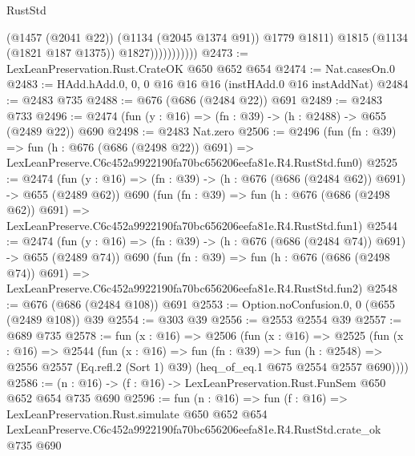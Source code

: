 \begin{lexlean}{RustStd}
\begin{coremodule}
                            (@1457 (@2041 @22))
                            (@1134 (@2045 @1374 @91))
                            @1779
                            @1811)
                          @1815
                          (@1134 (@1821 @187 @1375))
                          @1827)))))))))))
@2473 := LexLeanPreservation.Rust.CrateOK @650 @652 @654
@2474 := Nat.casesOn.{0}
@2483 := HAdd.hAdd.{0, 0, 0} @16 @16 @16 (instHAdd.{0} @16 instAddNat)
@2484 := @2483 @735
@2488 := @676 (@686 (@2484 @22)) @691
@2489 := @2483 @733
@2496 := @2474 (fun (y : @16) => (fn : @39) -> (h : @2488) -> @655 (@2489 @22)) @690
@2498 := @2483 Nat.zero
@2506 := @2496
    (fun (fn : @39) =>
    fun (h : @676 (@686 (@2498 @22)) @691) =>
    LexLeanPreserve.C6c452a9922190fa70bc656206eefa81e.R4.RustStd.fun0)
@2525 := @2474
    (fun (y : @16) => (fn : @39) -> (h : @676 (@686 (@2484 @62)) @691) -> @655 (@2489 @62))
    @690
    (fun (fn : @39) =>
    fun (h : @676 (@686 (@2498 @62)) @691) =>
    LexLeanPreserve.C6c452a9922190fa70bc656206eefa81e.R4.RustStd.fun1)
@2544 := @2474
    (fun (y : @16) => (fn : @39) -> (h : @676 (@686 (@2484 @74)) @691) -> @655 (@2489 @74))
    @690
    (fun (fn : @39) =>
    fun (h : @676 (@686 (@2498 @74)) @691) =>
    LexLeanPreserve.C6c452a9922190fa70bc656206eefa81e.R4.RustStd.fun2)
@2548 := @676 (@686 (@2484 @108)) @691
@2553 := Option.noConfusion.{0, 0} (@655 (@2489 @108)) @39
@2554 := @303 @39
@2556 := @2553 @2554 @39
@2557 := @689 @735
@2578 := fun (x : @16) =>
  @2506
    (fun (x : @16) =>
    @2525
      (fun (x : @16) =>
      @2544
        (fun (x : @16) =>
        fun (fn : @39) =>
        fun (h : @2548) =>
        @2556 @2557 (Eq.refl.{2} (Sort 1) @39) (heq_of_eq.{1} @675 @2554 @2557 @690))))
@2586 := (n : @16) -> (f : @16) -> LexLeanPreservation.Rust.FunSem @650 @652 @654 @735 @690
@2596 := fun (n : @16) =>
  fun (f : @16) =>
  LexLeanPreservation.Rust.simulate
    @650
    @652
    @654
    LexLeanPreserve.C6c452a9922190fa70bc656206eefa81e.R4.RustStd.crate_ok
    @735
    @690
\end{coremodule}
\end{lexlean}

